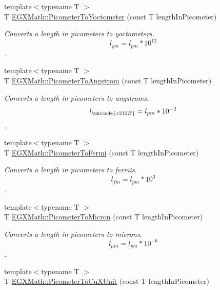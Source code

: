 \begin{DoxyCompactItemize}
{\footnotesize template$<$typename T $>$ }\\T \mbox{\hyperlink{group___e_g_x_math-_conversions-_length_conversions-_s_i-_picometer-_s_i_ga503eda76d6647261c50ec147c78dfbbc}{E\+G\+X\+Math\+::\+Picometer\+To\+Yoctometer}} (const T length\+In\+Picometer)
\begin{DoxyCompactList}\small\item\em Converts a length in picometers to yoctometers. \[ l_{ym}=l_{pm} * 10^{12} \]. \end{DoxyCompactList}\item 
{\footnotesize template$<$typename T $>$ }\\T \mbox{\hyperlink{group___e_g_x_math-_conversions-_length_conversions-_s_i-_picometer-_non-_s_i_ga0b1b4a3ec4ea0110477f4547025d2719}{E\+G\+X\+Math\+::\+Picometer\+To\+Angstrom}} (const T length\+In\+Picometer)
\begin{DoxyCompactList}\small\item\em Converts a length in picometers to angstroms. \[ l_{\unicode{x212B}}=l_{pm} * 10^{-2} \]. \end{DoxyCompactList}\item 
{\footnotesize template$<$typename T $>$ }\\T \mbox{\hyperlink{group___e_g_x_math-_conversions-_length_conversions-_s_i-_picometer-_non-_s_i_ga13ec47b0b50eca30313bb7902a28f0c9}{E\+G\+X\+Math\+::\+Picometer\+To\+Fermi}} (const T length\+In\+Picometer)
\begin{DoxyCompactList}\small\item\em Converts a length in picometers to fermis. \[ l_{fm}=l_{pm} * 10^{3} \]. \end{DoxyCompactList}\item 
{\footnotesize template$<$typename T $>$ }\\T \mbox{\hyperlink{group___e_g_x_math-_conversions-_length_conversions-_s_i-_picometer-_non-_s_i_gad8fddabe74b111596888c370081f725e}{E\+G\+X\+Math\+::\+Picometer\+To\+Micron}} (const T length\+In\+Picometer)
\begin{DoxyCompactList}\small\item\em Converts a length in picometers to microns. \[ l_{\mu m}=l_{pm} * 10^{-6} \]. \end{DoxyCompactList}\item 
{\footnotesize template$<$typename T $>$ }\\T \mbox{\hyperlink{group___e_g_x_math-_conversions-_length_conversions-_s_i-_picometer-_non-_s_i_gab393c0c7c90ba14ff56f8eac343524ff}{E\+G\+X\+Math\+::\+Picometer\+To\+Cu\+X\+Unit}} (const T length\+In\+Picometer)

\end{DoxyCompactItemize}
